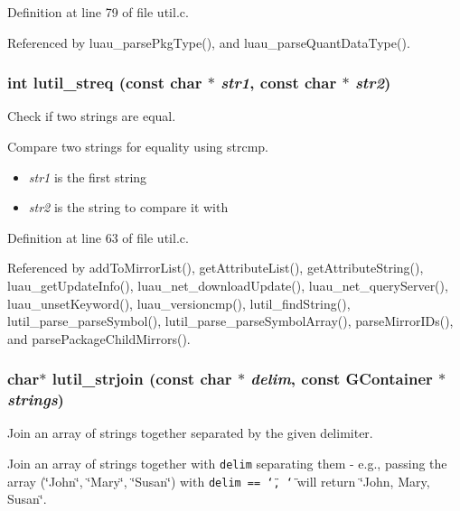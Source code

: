 Definition at line 79 of file util.c.

Referenced by luau\_\-parse\-Pkg\-Type(), and luau\_\-parse\-Quant\-Data\-Type().
\subsubsection{\setlength{\rightskip}{0pt plus 5cm}int lutil\_\-streq (const char $\ast$ {\em str1}, const char $\ast$ {\em str2})\hspace{0.3cm}{\tt  [inline]}}\label{util_8h_a10}


Check if two strings are equal. 

Compare two strings for equality using strcmp.

\begin{itemize}
\item {\em str1\/} is the first string \item {\em str2\/} is the string to compare it with 
\end{itemize}


Definition at line 63 of file util.c.

Referenced by add\-To\-Mirror\-List(), get\-Attribute\-List(), get\-Attribute\-String(), luau\_\-get\-Update\-Info(), luau\_\-net\_\-download\-Update(), luau\_\-net\_\-query\-Server(), luau\_\-unset\-Keyword(), luau\_\-versioncmp(), lutil\_\-find\-String(), lutil\_\-parse\_\-parse\-Symbol(), lutil\_\-parse\_\-parse\-Symbol\-Array(), parse\-Mirror\-IDs(), and parse\-Package\-Child\-Mirrors().
\subsubsection{\setlength{\rightskip}{0pt plus 5cm}char$\ast$ lutil\_\-strjoin (const char $\ast$ {\em delim}, const {\bf GContainer} $\ast$ {\em strings})}\label{util_8h_a15}


Join an array of strings together separated by the given delimiter. 

Join an array of strings together with {\tt delim} separating them - e.g., passing the array (\char`\"{}John\char`\"{}, \char`\"{}Mary\char`\"{}, \char`\"{}Susan\char`\"{}) with {\tt delim == \char`\"{}, \char`\"{}} will return \char`\"{}John, Mary, Susan\char`\"{}.

